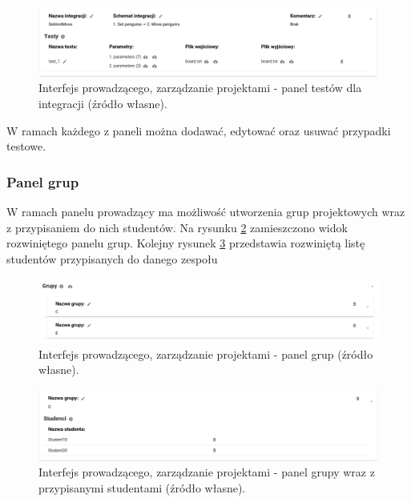 \begin{figure}[h]
    \centering
    \includegraphics[width = 15cm]{chapter04/lecturer_integrations_tests.png}
    \caption{Interfejs prowadzącego, zarządzanie projektami - panel testów dla integracji (źródło własne).}
    \label{fig:lecturer_integrations_tests}
\end{figure}

W ramach każdego z paneli można dodawać, edytować oraz usuwać przypadki testowe.

\subsubsection{Panel grup}

W ramach panelu prowadzący ma możliwość utworzenia grup projektowych wraz z przypisaniem do nich studentów.
Na rysunku \ref{fig:lecturer_groups} zamieszczono widok rozwiniętego panelu grup.
Kolejny rysunek \ref{fig:lecturer_students_in_group} przedstawia rozwiniętą listę studentów przypisanych do danego zespołu

\begin{figure}[h]
    \centering
    \includegraphics[width = 13cm]{chapter04/lecturer_groups.png}
    \caption{Interfejs prowadzącego, zarządzanie projektami - panel grup (źródło własne).}
    \label{fig:lecturer_groups}
\end{figure}

\begin{figure}[h]
    \centering
    \includegraphics[width = 13cm]{chapter04/lecturer_students_in_group.png}
    \caption{Interfejs prowadzącego, zarządzanie projektami - panel grupy wraz z przypisanymi studentami (źródło własne).}
    \label{fig:lecturer_students_in_group}
\end{figure}

